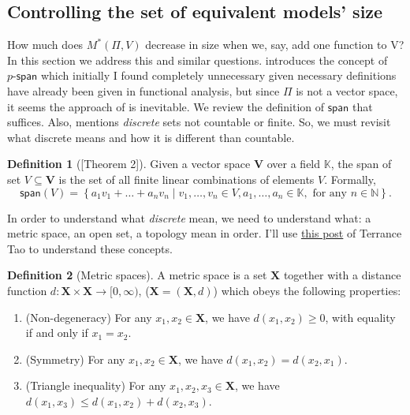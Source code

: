 \documentclass[a4paper]{article}
\theoremstyle{definition}
\newtheorem{definition}{Definition}
\theoremstyle{remark}
\theoremstyle{plain}
\newcommand{\bV}{\mathbf{V}}
\newcommand{\bX}{\mathbf{X}}
\newcommand{\K}{\mathbb{K}}
\newcommand{\N}{\mathbb{N}}
\begin{document}
\subsection{Controlling the set of equivalent models' size}
How much does $M^*(\Pi, V)$ decrease in size when we, say, add one function to V? In this section we address this and similar questions. \citet{grimm2020value} introduces the concept of $p\textsf{-span}$ which initially I found completely unnecessary given necessary definitions have already been given in functional analysis, but since $\Pi$ is not a vector space, it seems the approach of \citet{grimm2020value} is inevitable. We review the definition of $\textsf{span}$ that suffices. Also, \citet{grimm2020value} mentions \emph{discrete} sets not countable or finite. So, we must revisit what discrete means and how it is different than countable.
%
\begin{definition}[{\normalfont \citet{lax2014functional}[Theorem 2]}]
Given a vector space $\bV$ over a field $\K$, the span of set $V \subseteq \bV$ is the set of all finite linear combinations of elements $V$. Formally,
\begin{equation*}
    \textsf{span}(V) = \left\{a_1v_1 + \dots + a_nv_n \mid v_1,\dots, v_n \in V, a_1, \dots, a_n \in \K, \text{ for any } n \in \N\right\}.
\end{equation*}
\end{definition}
%
In order to understand what \emph{discrete} mean, we need to understand what: a metric space, an open set, a topology mean in order. I'll use \href{https://terrytao.wordpress.com/2009/01/30/254a-notes-8-a-quick-review-of-point-set-topology/}{this post} of Terrance Tao to understand these concepts.
\begin{definition}[Metric spaces]
    A metric space is a set $\bX$ together with a distance function $d: \bX \times \bX \to [0, \infty)$, ($\bX = (\bX, d)$) which obeys the following properties:
    \begin{enumerate}[label=(\Alph*)]
        \item (Non-degeneracy) For any $x_1, x_2 \in \bX$, we have $d(x_1, x_2) \geq 0$, with equality if and only if $x_1 = x_2$.
        \item (Symmetry) For any $x_1, x_2 \in \bX$, we have $d(x_1, x_2) = d(x_2, x_1)$.
        \item (Triangle inequality) For any $x_1, x_2, x_3 \in \bX$, we have $d(x_1, x_3) \leq d(x_1, x_2) + d(x_2, x_3)$.
    \end{enumerate}
\end{definition}
\end{document}

